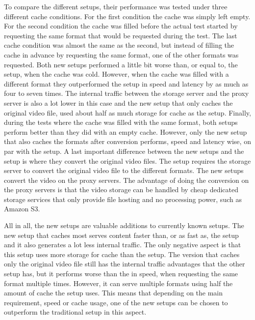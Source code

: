 \documentclass[twoside,openright]{uva-bachelor-thesis}
\begin{document}
To compare the different setups, their performance was tested under three
different cache conditions. For the first condition the cache was simply
left empty. For the second condition the cache was filled before the actual test
started by requesting the same format that would be requested during the test.
The last cache condition was almost the same as the second, but instead of
filling the cache in advance by requesting the same format, one of the other
formats was requested.  Both new setups performed a little bit worse than, or
equal to, the \cdn setup, when the cache was cold. However, when the cache was
filled with a different format they outperformed the \cdn setup in speed and
latency by as much as four to seven times. The internal traffic between the
storage server and the proxy server is also a lot lower in this case and the new
setup that only caches the original video file, used about half as much storage
for cache as the \cdn setup. Finally, during the tests where the cache was
filled with the same format, both setups perform better than they did with
an empty cache. However, only the new setup that also caches the formats after
conversion performs, speed and latency
wise, on par with the \cdn setup. A last important difference between the new
setups and the \cdn setup is where they convert the original video files. The
\cdn setup requires the storage server to convert the original video file to the
different formats. The new setups convert the video on the proxy servers. The
advantage of doing the conversion on the proxy servers is that the video storage
can be handled by cheap dedicated storage services that only provide file
hosting and no processing power, such as Amazon S3.

All in all, the new setups are valuable additions to currently known setups.
The new setup that caches most serves content faster than, or as fast as, the
\cdn setup and it also generates a lot less internal traffic.  The only negative
aspect is that this setup uses more storage for cache than the \cdn setup. The
version that caches only the original video file still has the internal traffic
advantages that the other setup has, but it performs worse than the \cdn in
speed, when requesting the same format multiple times. However, it can serve
multiple formats using half the amount of cache the \cdn setup uses. This means
that depending on the main requirement, speed or cache usage, one of the new
setups can be chosen to outperform the traditional \cdn setup in this aspect.
\end{document}
